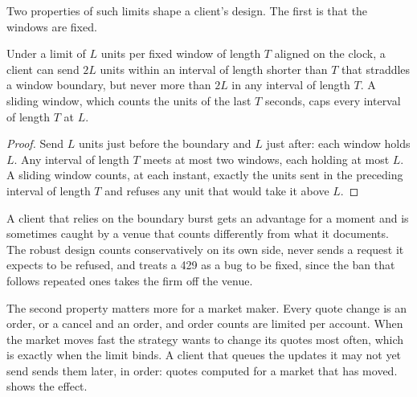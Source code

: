 Two properties of such limits shape a client's design. The first is that the windows are fixed.

\begin{proposition}\label{prop:m3:centralised-exchanges:burst}
Under a limit of $L$ units per fixed window of length $T$ aligned on the clock, a client can send $2L$
units within an interval of length shorter than $T$ that straddles a window boundary, but never more
than $2L$ in any interval of length $T$. A sliding window, which counts the units of the last $T$
seconds, caps every interval of length $T$ at $L$.
\end{proposition}

\begin{proof}
Send $L$ units just before the boundary and $L$ just after: each window holds $L$. Any interval of
length $T$ meets at most two windows, each holding at most $L$. A sliding window counts, at each
instant, exactly the units sent in the preceding interval of length $T$ and refuses any unit that would
take it above $L$.
\end{proof}

A client that relies on the boundary burst gets an advantage for a moment and is sometimes caught by a
venue that counts differently from what it documents. The robust design counts conservatively on its own
side, never sends a request it expects to be refused, and treats a 429 as a bug to be fixed, since the
ban that follows repeated ones takes the firm off the venue.

The second property matters more for a market maker. Every quote change is an order, or a cancel and an
order, and order counts are limited per account. When the market moves fast the strategy wants to change
its quotes most often, which is exactly when the limit binds. A client that queues the updates it may not
yet send sends them later, in order: quotes computed for a market that has moved.
 shows the effect.

